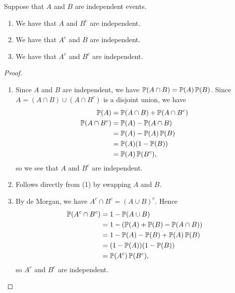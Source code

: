 \begin{proposition}
  Suppose that $A$ and $B$ are independent events.
  \begin{enumerate}
    \item We have that $A$ and $B^{c}$ are independent.
    \item We have that $A^{c}$ and $B$ are independent.
    \item We have that $A^{c}$ and $B^{c}$ are independent.
  \end{enumerate}
\end{proposition}
\begin{proof} \leavevmode
  \begin{enumerate}
    \item Since $A$ and $B$ are independent, we have $\operatorname{\mathbb{P}}(A \cap B) = \operatorname{\mathbb{P}}(A) \operatorname{\mathbb{P}}(B)$. Since $A = (A \cap B) \cup (A \cap B^{c})$ is a disjoint union, we have
      \begin{align*}
        \operatorname{\mathbb{P}}(A) &= \operatorname{\mathbb{P}}(A \cap B) + \operatorname{\mathbb{P}}(A \cap B^{c}) \\
        \operatorname{\mathbb{P}}(A \cap B^{c}) &= \operatorname{\mathbb{P}}(A) - \operatorname{\mathbb{P}}(A \cap B) \\
                            &= \operatorname{\mathbb{P}}(A) - \operatorname{\mathbb{P}}(A) \operatorname{\mathbb{P}}(B) \\
                            &= \operatorname{\mathbb{P}}(A) (1 - \operatorname{\mathbb{P}}(B)) \\
                            &= \operatorname{\mathbb{P}}(A) \operatorname{\mathbb{P}}(B^{c}),
      \end{align*}
      so we see that $A$ and $B^{c}$ are independent.
    \item Follows directly from (1) by swapping $A$ and $B$.
    \item By de Morgan, we have $A^c \cap B^c = (A \cup B)^{c}$. Hence 
      \begin{align*}
        \operatorname{\mathbb{P}}(A^c \cap B^c) &= 1 - \operatorname{\mathbb{P}}(A \cup B) \\
                            &= 1 - (\operatorname{\mathbb{P}}(A) + \operatorname{\mathbb{P}}(B) - \operatorname{\mathbb{P}}(A \cap B)) \\
                            &= 1 - \operatorname{\mathbb{P}}(A) - \operatorname{\mathbb{P}}(B) + \operatorname{\mathbb{P}}(A) \operatorname{\mathbb{P}}(B) \\
                            &= (1 - \operatorname{\mathbb{P}}(A)) (1 - \operatorname{\mathbb{P}}(B)) \\
                            &= \operatorname{\mathbb{P}}(A^{c})\operatorname{\mathbb{P}}(B^{c}),
      \end{align*}
      so $A^{c}$ and $B^{c}$ are independent. \qedhere
  \end{enumerate}
\end{proof}

